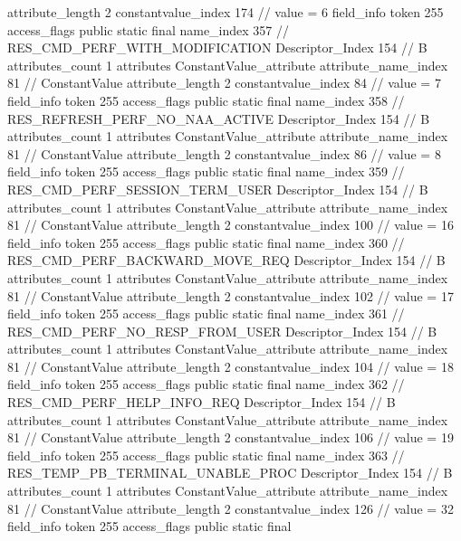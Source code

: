{{{{{{{					attribute_length	2
					constantvalue_index	174		// value = 6
				}
				}
			}
			field_info {
				token	255
				access_flags	public static final
				name_index	357		// RES_CMD_PERF_WITH_MODIFICATION
				Descriptor_Index	154		// B
				attributes_count	1
				attributes {
				ConstantValue_attribute {
					attribute_name_index	81		// ConstantValue
					attribute_length	2
					constantvalue_index	84		// value = 7
				}
				}
			}
			field_info {
				token	255
				access_flags	public static final
				name_index	358		// RES_REFRESH_PERF_NO_NAA_ACTIVE
				Descriptor_Index	154		// B
				attributes_count	1
				attributes {
				ConstantValue_attribute {
					attribute_name_index	81		// ConstantValue
					attribute_length	2
					constantvalue_index	86		// value = 8
				}
				}
			}
			field_info {
				token	255
				access_flags	public static final
				name_index	359		// RES_CMD_PERF_SESSION_TERM_USER
				Descriptor_Index	154		// B
				attributes_count	1
				attributes {
				ConstantValue_attribute {
					attribute_name_index	81		// ConstantValue
					attribute_length	2
					constantvalue_index	100		// value = 16
				}
				}
			}
			field_info {
				token	255
				access_flags	public static final
				name_index	360		// RES_CMD_PERF_BACKWARD_MOVE_REQ
				Descriptor_Index	154		// B
				attributes_count	1
				attributes {
				ConstantValue_attribute {
					attribute_name_index	81		// ConstantValue
					attribute_length	2
					constantvalue_index	102		// value = 17
				}
				}
			}
			field_info {
				token	255
				access_flags	public static final
				name_index	361		// RES_CMD_PERF_NO_RESP_FROM_USER
				Descriptor_Index	154		// B
				attributes_count	1
				attributes {
				ConstantValue_attribute {
					attribute_name_index	81		// ConstantValue
					attribute_length	2
					constantvalue_index	104		// value = 18
				}
				}
			}
			field_info {
				token	255
				access_flags	public static final
				name_index	362		// RES_CMD_PERF_HELP_INFO_REQ
				Descriptor_Index	154		// B
				attributes_count	1
				attributes {
				ConstantValue_attribute {
					attribute_name_index	81		// ConstantValue
					attribute_length	2
					constantvalue_index	106		// value = 19
				}
				}
			}
			field_info {
				token	255
				access_flags	public static final
				name_index	363		// RES_TEMP_PB_TERMINAL_UNABLE_PROC
				Descriptor_Index	154		// B
				attributes_count	1
				attributes {
				ConstantValue_attribute {
					attribute_name_index	81		// ConstantValue
					attribute_length	2
					constantvalue_index	126		// value = 32
				}
				}
			}
			field_info {
				token	255
				access_flags	public static final
}}}}}
